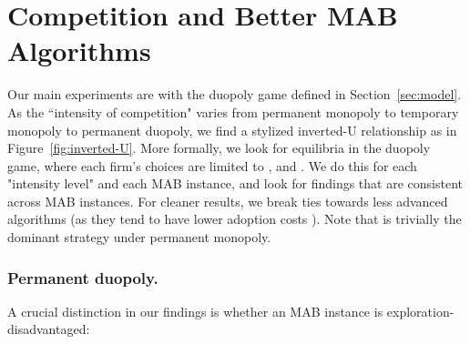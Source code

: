 \documentclass[../competing_bandits.tex]{subfiles}
\begin{document}
\section{Competition and Better MAB Algorithms}\label{section:5}

Our main experiments are with the duopoly game defined in Section~\ref{sec:model}. As the ``intensity of competition" varies from permanent monopoly to temporary monopoly to permanent duopoly, we find a stylized inverted-U relationship as in Figure~\ref{fig:inverted-U}. More formally, we look for equilibria in the duopoly game, where each firm's choices are limited to \DG, \DEG and \TS. We do this for each "intensity level" and each MAB instance, and look for findings that are consistent across MAB instances. For cleaner results, we break ties towards less advanced algorithms (as they tend to have lower adoption costs \cite{MWT-WhitePaper-2016,DS-arxiv}). Note that \DG is trivially the dominant strategy under permanent monopoly.



\subsubsection{Permanent duopoly.}
A crucial distinction in our findings is whether an MAB instance is exploration-disadvantaged:

\end{document}
